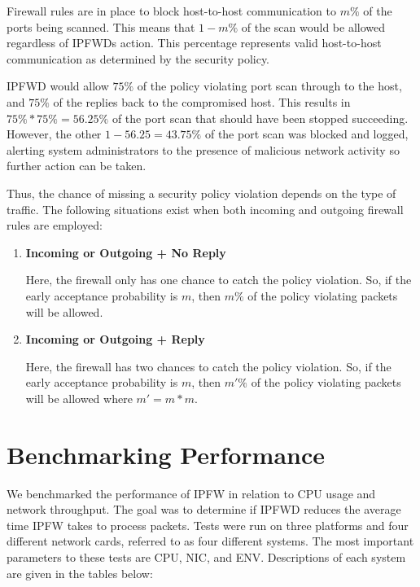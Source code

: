\documentclass[journal]{IEEEtran}
\begin{document}
    Firewall rules are in place to block host-to-host communication to $m\%$ of
    the ports being scanned. This means that $1 - m\%$ of the scan would be
    allowed regardless of IPFWDs action. This percentage represents valid
    host-to-host communication as determined by the security policy.

    IPFWD would allow $75\%$ of the policy violating port scan through to the
    host, and $75\%$ of the replies back to the compromised host. This results
    in $75\% * 75\% = 56.25\%$ of the port scan that should have been stopped
    succeeding.  However, the other $1 - 56.25 = 43.75\%$ of the port scan was
    blocked and logged, alerting system administrators to the presence of
    malicious network activity so further action can be taken.

  Thus, the chance of missing a security policy violation depends on the type
  of traffic. The following situations exist when both incoming and outgoing
  firewall rules are employed:

  \begin{enumerate}

    \item \textbf{Incoming or Outgoing + No Reply}

      Here, the firewall only has one chance to catch the policy violation.
      So, if the early acceptance probability is $m$, then $m\%$ of the policy
      violating packets will be allowed.

    \item \textbf{Incoming or Outgoing + Reply}

      Here, the firewall has two chances to catch the policy violation. So,
      if the early acceptance probability is $m$, then $m'\%$ of the policy
      violating packets will be allowed where $m' = m * m$.

  \end{enumerate}


\section{Benchmarking Performance}

  We benchmarked the performance of IPFW in relation to CPU usage and network
  throughput. The goal was to determine if IPFWD reduces the average time IPFW
  takes to process packets. Tests were run on three platforms and four
  different network cards, referred to as four different systems. The most
  important parameters to these tests are CPU, NIC, and ENV. Descriptions of
  each system are given in the tables below:\\
\end{document}
